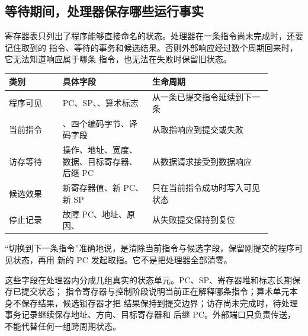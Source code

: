 \subsection{等待期间，处理器保存哪些运行事实}

寄存器表只列出了程序能够直接命名的状态。处理器在一条指令尚未完成时，还要记住取到的
指令、等待的事务和候选结果。否则外部响应经过数个周期回来时，它无法知道响应属于哪条
指令，也无法在失败时保留旧状态。


\begin{longtable}{|L{0.18\linewidth}|L{0.30\linewidth}|L{0.40\linewidth}|}
\hline
{}
类别 & 具体字段 & 生命周期 \\ \hline
程序可见 & PC、SP、、算术标志 & 从一条已提交指令延续到下一条 \\ \hline
当前指令 & 、四个编码字节、译码字段 & 从取指响应到提交或失败 \\ \hline
访存等待 & 操作、地址、宽度、数据、目标寄存器、后继 PC & 从数据请求接受到数据响应 \\ \hline
候选效果 & 新寄存器值、新 PC、新 SP & 只在当前指令成功时写入可见状态 \\ \hline
停止记录 & 故障 PC、地址、原因、 & 从失败提交保持到复位 \\ \hline
\end{longtable}

“切换到下一条指令”准确地说，是清除当前指令与候选字段，保留刚提交的程序可见状态，再用
新的 PC 发起取指。它不是把处理器全部清零。

这些字段在处理器内分成几组真实的状态单元。PC、SP、寄存器堆和标志长期保存已提交状态；
指令寄存器与控制阶段说明当前正在解释哪条指令；算术单元本身不保存结果，候选锁存器才把
结果保持到提交边界；访存尚未完成时，待处理事务记录继续保存地址、方向、目标寄存器和
后继 PC。外部端口只负责传送，不能代替任何一组跨周期状态。

